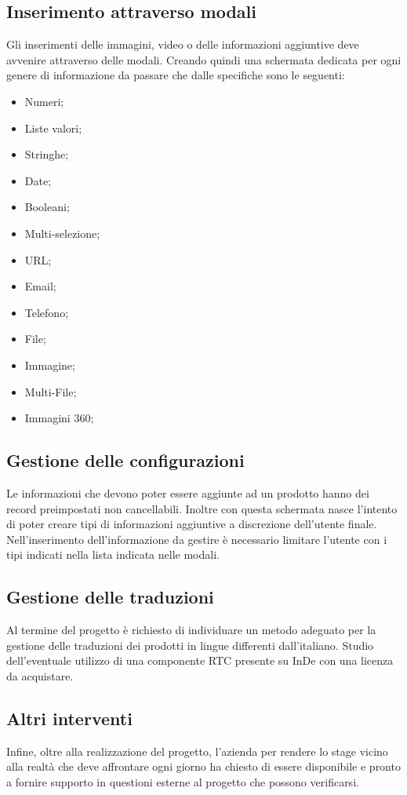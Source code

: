 \subsection{Inserimento attraverso modali}
Gli inserimenti delle immagini, video o delle informazioni aggiuntive deve avvenire attraverso delle modali. Creando quindi una schermata dedicata per ogni genere di informazione da passare che dalle specifiche sono le seguenti:
\begin{itemize}
	\item Numeri;
	\item Liste valori;
	\item Stringhe;
	\item Date;
	\item Booleani;
	\item Multi-selezione;
	\item URL;
	\item Email;
	\item Telefono;
	\item File;
	\item Immagine;
	\item Multi-File;
	\item Immagini 360;
\end{itemize}

\subsection{Gestione delle configurazioni}
Le informazioni che devono poter essere aggiunte ad un prodotto hanno dei record preimpostati non cancellabili. Inoltre con questa schermata nasce l'intento di poter creare tipi di informazioni aggiuntive a discrezione dell'utente finale.
Nell'inserimento dell'informazione da gestire è necessario limitare l'utente con i tipi indicati nella lista indicata nelle modali.

\subsection{Gestione delle traduzioni}
Al termine del progetto è richiesto di individuare un metodo adeguato per la gestione delle traduzioni dei prodotti in lingue differenti dall'italiano. Studio dell'eventuale utilizzo di una componente RTC presente su InDe con una licenza da acquistare.

\subsection{Altri interventi}
Infine, oltre alla realizzazione del progetto, l'azienda per rendere lo stage vicino alla realtà che deve affrontare ogni giorno ha chiesto di essere disponibile e pronto a fornire supporto in questioni esterne al progetto che possono verificarsi.

